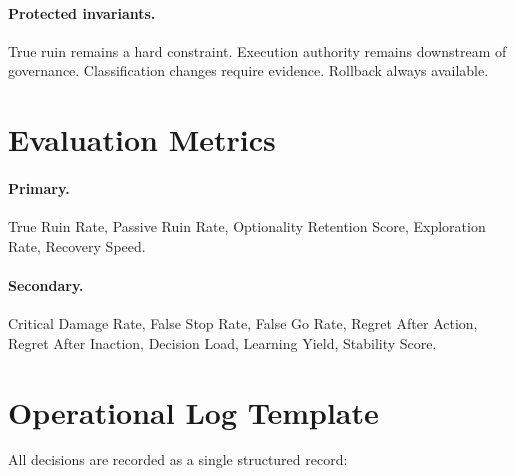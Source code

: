 \paragraph{Protected invariants.}
True ruin remains a hard constraint. Execution authority remains
downstream of governance. Classification changes require evidence.
Rollback always available.

\section{Evaluation Metrics}
\label{sec:omega-eval-metrics}

\paragraph{Primary.}
True Ruin Rate, Passive Ruin Rate, Optionality Retention Score,
Exploration Rate, Recovery Speed.

\paragraph{Secondary.}
Critical Damage Rate, False Stop Rate, False Go Rate, Regret After
Action, Regret After Inaction, Decision Load, Learning Yield,
Stability Score.

\section{Operational Log Template}
\label{sec:omega-log-template}

All decisions are recorded as a single structured record:

